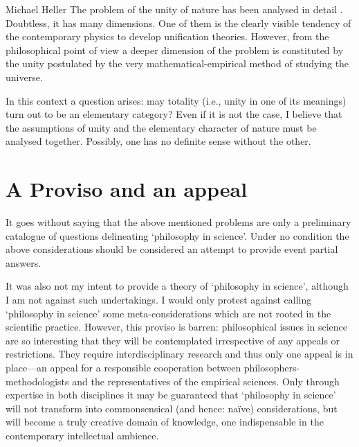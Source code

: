 \begin{artengenv}{Michael Heller}
The problem of the unity of nature has been analysed in detail
\parencite[cf.][]{weizsacker_unity_1980}.
Doubtless, it has many dimensions. One of them is the clearly visible tendency of the contemporary physics to develop
unification theories. However, from the philosophical point of view a deeper dimension of the problem is constituted by
the unity postulated by the very mathematical-empirical method of studying the universe.

In this context a question arises: may totality (i.e., unity in one of its meanings) turn out to be an elementary
category? Even if it is not the case, I believe that the assumptions of unity and the elementary character of nature
must be analysed together. Possibly, one has no definite sense without the other.


\section{A Proviso and an appeal}


It goes without saying that the above mentioned problems are only a preliminary catalogue of questions delineating
`philosophy in science'. Under no condition the above considerations should be considered an attempt to provide event
partial answers.

It was also not my intent to provide a theory of `philosophy in science', although I am not against such
undertakings. I would only protest against calling `philosophy in science' some meta-considerations which are not
rooted in the scientific practice.\label{heller-not-rooted} However, this proviso is barren: philosophical issues in science are so interesting
that they will be contemplated irrespective of any appeals or restrictions. They require interdisciplinary research and
thus only one appeal is in place---an appeal for a responsible cooperation between philosophers-methodologists and the
representatives of the empirical sciences. Only through expertise in both disciplines it may be guaranteed that
`philosophy in science' will not transform into commonsensical (and hence: naïve) considerations, but will become a
truly creative domain of knowledge, one indispensable in the contemporary intellectual ambience.\label{heller-conclusion}








\end{artengenv}\label{heller-stop}
